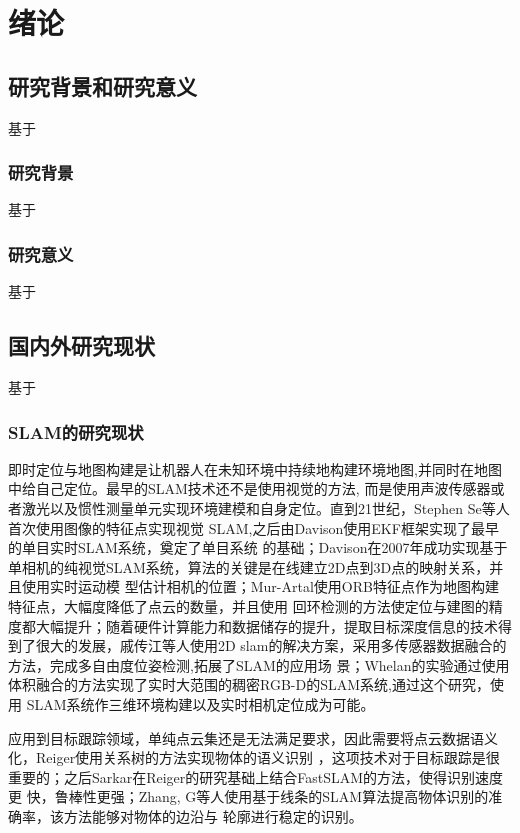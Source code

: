 \chapter{绪论}
\label{cha:chap1}
\section{研究背景和研究意义}
\label{sec:1.1}
基于
\subsection{研究背景}
\label{sec:1.1.1}
基于
\subsection{研究意义}
\label{sec:1.1.2}
基于
\section{国内外研究现状}
\label{sec:1.2}
基于
\subsection{SLAM的研究现状}
\label{sec:1.2.1}
即时定位与地图构建是让机器人在未知环境中持续地构建环境地图,并同时在地图中给自己定位。最早的SLAM技术还不是使用视觉的方法,
而是使用声波传感器或者激光以及惯性测量单元实现环境建模和自身定位。直到21世纪，Stephen Se等人首次使用图像的特征点实现视觉
SLAM\cite{se2002mobile},之后由Davison使用EKF框架实现了最早的单目实时SLAM系统\cite{davison2003real}，奠定了单目系统
的基础；Davison在2007年成功实现基于单相机的纯视觉SLAM系统，算法的关键是在线建立2D点到3D点的映射关系，并且使用实时运动模
型估计相机的位置\cite{davison2007monoslam}；Mur-Artal使用ORB特征点作为地图构建特征点，大幅度降低了点云的数量，并且使用
回环检测的方法使定位与建图的精度都大幅提升\cite{mur2015orb}；随着硬件计算能力和数据储存的提升，提取目标深度信息的技术得
到了很大的发展，戚传江等人使用2D slam的解决方案，采用多传感器数据融合的方法，完成多自由度位姿检测,拓展了SLAM的应用场
景；Whelan的实验通过使用体积融合的方法实现了实时大范围的稠密RGB-D的SLAM系统\cite{whelan2015real},通过这个研究，使用
SLAM系统作三维环境构建以及实时相机定位成为可能。

应用到目标跟踪领域，单纯点云集还是无法满足要求，因此需要将点云数据语义化，Reiger使用关系树的方法实现物体的语义识别
\cite{sarkar2012slam}，这项技术对于目标跟踪是很重要的；之后Sarkar在Reiger的研究基础上结合FastSLAM的方法，使得识别速度更
快，鲁棒性更强；Zhang, G等人使用基于线条的SLAM算法\cite{zhang2015building}提高物体识别的准确率，该方法能够对物体的边沿与
轮廓进行稳定的识别。

